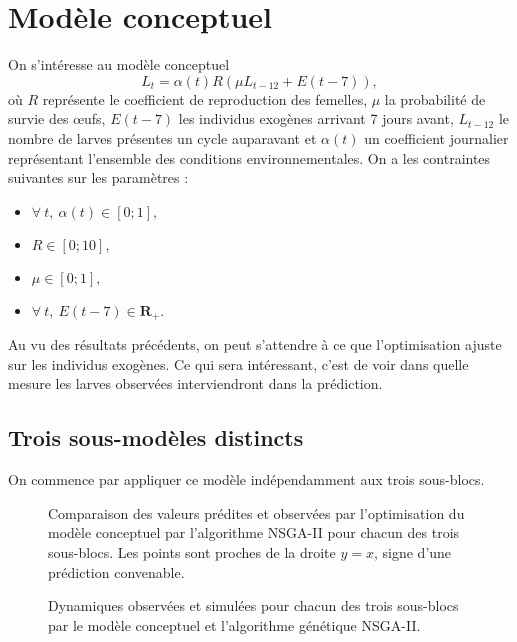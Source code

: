 \documentclass[a4paper, 11pt]{article}
\begin{document}
\section{Modèle conceptuel}

On s'intéresse au modèle conceptuel
$$L_t = \alpha(t) R \left( \mu L_{t-12} + E(t-7) \right),$$
où $R$ représente le coefficient de reproduction des femelles, $\mu$ la probabilité de survie des œufs, $E(t-7)$ les individus exogènes arrivant 7 jours avant, $L_{t-12}$ le nombre de larves présentes un cycle auparavant et $\alpha(t)$ un coefficient journalier représentant l'ensemble des conditions environnementales. On a les contraintes suivantes sur les paramètres :
\begin{itemize}
 \item $\forall\ t,\ \alpha(t) \in [0;1],$
 \item $R \in [0;10],$
 \item $\mu \in [0;1],$
 \item $\forall\ t,\ E(t-7) \in \mathbf{R}_+$.
\end{itemize}

Au vu des résultats précédents, on peut s'attendre à ce que l'optimisation ajuste sur les individus exogènes. Ce qui sera intéressant, c'est de voir dans quelle mesure les larves observées interviendront dans la prédiction.

\subsection{Trois sous-modèles distincts}

On commence par appliquer ce modèle indépendamment aux trois sous-blocs.



\begin{figure}[ht]
 \centering
 \caption{Comparaison des valeurs prédites et observées par l'optimisation du modèle conceptuel par l'algorithme NSGA-II pour chacun des trois sous-blocs.  Les points sont proches de la droite $y =x$, signe d'une prédiction convenable.}
 \label{fig:nsga}
\end{figure}

\begin{figure}[ht]
 \centering
 \caption{Dynamiques observées et simulées pour chacun des trois sous-blocs par le modèle conceptuel et l'algorithme génétique NSGA-II.}
 \label{fig:tnsga}
\end{figure}
\end{document}
